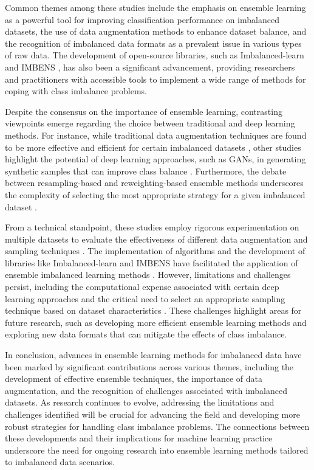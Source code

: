 \documentclass[conference]{IEEEtran}
\begin{document}
Common themes among these studies include the emphasis on ensemble learning as a powerful tool for improving classification performance on imbalanced datasets, the use of data augmentation methods to enhance dataset balance, and the recognition of imbalanced data formats as a prevalent issue in various types of raw data. The development of open-source libraries, such as Imbalanced-learn \cite{b2} and IMBENS \cite{b3}, has also been a significant advancement, providing researchers and practitioners with accessible tools to implement a wide range of methods for coping with class imbalance problems.

Despite the consensus on the importance of ensemble learning, contrasting viewpoints emerge regarding the choice between traditional and deep learning methods. For instance, while traditional data augmentation techniques are found to be more effective and efficient for certain imbalanced datasets \cite{b1}, other studies highlight the potential of deep learning approaches, such as GANs, in generating synthetic samples that can improve class balance \cite{b1}. Furthermore, the debate between resampling-based and reweighting-based ensemble methods underscores the complexity of selecting the most appropriate strategy for a given imbalanced dataset \cite{b2, b3}.

From a technical standpoint, these studies employ rigorous experimentation on multiple datasets to evaluate the effectiveness of different data augmentation and sampling techniques \cite{b1, b5}. The implementation of algorithms and the development of libraries like Imbalanced-learn and IMBENS have facilitated the application of ensemble imbalanced learning methods \cite{b2, b3}. However, limitations and challenges persist, including the computational expense associated with certain deep learning approaches \cite{b1} and the critical need to select an appropriate sampling technique based on dataset characteristics \cite{b5}. These challenges highlight areas for future research, such as developing more efficient ensemble learning methods and exploring new data formats that can mitigate the effects of class imbalance.

In conclusion, advances in ensemble learning methods for imbalanced data have been marked by significant contributions across various themes, including the development of effective ensemble techniques, the importance of data augmentation, and the recognition of challenges associated with imbalanced datasets. As research continues to evolve, addressing the limitations and challenges identified will be crucial for advancing the field and developing more robust strategies for handling class imbalance problems. The connections between these developments and their implications for machine learning practice underscore the need for ongoing research into ensemble learning methods tailored to imbalanced data scenarios.
\end{document}
